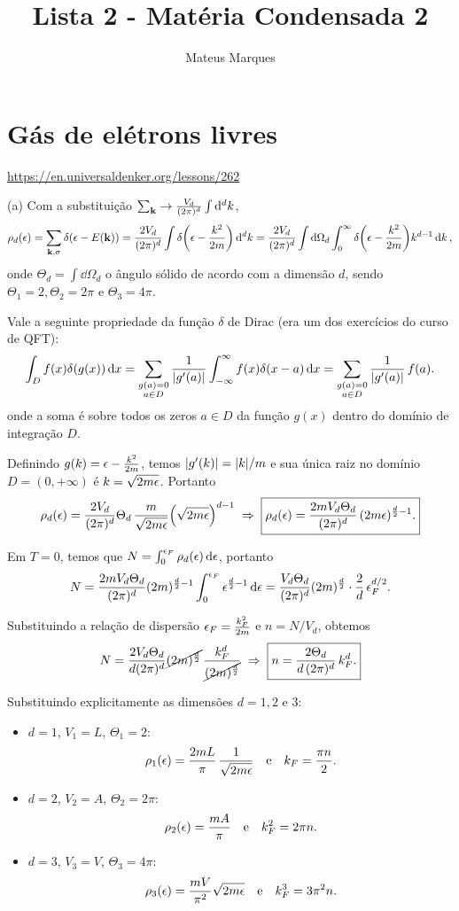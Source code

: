 \documentclass[a4paper,10pt]{article}
\title{\Huge{\textbf{Lista 2 - Matéria Condensada 2}}}
\author{Mateus Marques}
\begin{document}
\maketitle


\section{Gás de elétrons livres}

\url{https://en.universaldenker.org/lessons/262}

(a) Com a substituição $\sum_{\k} \to \frac{V_d}{(2\pi)^d} \int \dd[d]{k}$,
$$
\rho_d(\eps) = \sum_{\k, \s} \delta(\eps - E(\k)) =
\frac{2V_d}{(2\pi)^d} \int \delta\qty(\eps - \frac{k^2}{2m}) \dd[d]{k} =
\frac{2V_d}{(2\pi)^d} \int \dd{\Omega_d} \int_0^\infty \delta\qty(\eps - \frac{k^2}{2m}) k^{d-1} \dd{k},
$$
onde $\Theta_d = \int \dd{\Omega_d}$ o ângulo sólido de acordo com a dimensão $d$, sendo $\Theta_1 = 2, \Theta_2 = 2\pi$ e $\Theta_3 = 4\pi$.

Vale a seguinte propriedade da função $\delta$ de Dirac (era um dos exercícios do curso de QFT):
$$
\int_{D} f(x) \delta(g(x)) \dd{x} =
\sum_{\substack{g(a)=0 \\ a \in D}} \frac{1}{\abs{g'(a)}} \int_{-\infty}^{\infty} f(x) \delta(x-a) \dd{x}=
\sum_{\substack{g(a)=0 \\ a \in D}} \frac{1}{\abs{g'(a)}} \, f(a).
$$
onde a soma é sobre todos os zeros $a \in D$ da função $g(x)$ dentro do domínio de integração $D$.

Definindo $g(k) = \eps - \frac{k^2}{2m}$, temos $\abs{g'(k)} = \abs{k} / m$ e sua única raiz no domínio $D = (0, +\infty)$ é $k = \sqrt{2m \eps}$. Portanto
$$
\rho_d(\eps) = \frac{2V_d}{(2\pi)^d} \Theta_d \, \frac{m}{\sqrt{2m\eps}}
\qty(\sqrt{2m \eps})^{d-1} \implies
\boxed{ \rho_d(\eps) = \frac{2 m V_d \Theta_d}{(2\pi)^d} \, (2m\eps)^{\frac{d}{2}-1}. }
$$

Em $T = 0$, temos que $N = \int_0^{\eps_F} \rho_d(\eps) \dd{\eps}$, portanto
$$
N = \frac{2m V_d \Theta_d}{(2\pi)^d} (2m)^{\frac{d}{2} - 1} \int_0^{\eps_F} \eps^{\frac{d}{2} - 1} \dd{\eps} =
\frac{V_d \Theta_d }{(2\pi)^d} (2m)^{\frac{d}{2}} \cdot \frac{2}{d} \, \eps_F^{d/2}.
$$

Substituindo a relação de dispersão $\eps_F = \frac{k_F^2}{2m}$ e $n = N/V_d$, obtemos
$$
N =
\frac{2 V_d \Theta_d }{d (2\pi)^d} \cancel{(2m)^{\frac{d}{2}}} \, \frac{k_F^d}{\cancel{(2m)^{\frac{d}{2}}}} \implies
\boxed{ n = \frac{2 \Theta_d}{d \, (2\pi)^d} \, k_F^d. }
$$

Substituindo explicitamente as dimensões $d = 1, 2$ e $3$:
\begin{itemize}
\item $d = 1$, $V_1 = L$, $\Theta_1 = 2$:
$$
\rho_1(\eps) = \frac{2 m L}{\pi} \, \frac{1}{\sqrt{2m\eps}} \e
k_F = \frac{\pi n}{2}.
$$
\item $d = 2$, $V_2 = A$, $\Theta_2 = 2\pi$:
$$
\rho_2(\eps) = \frac{m A}{\pi} \e
k_F^2 = 2 \pi n.
$$
\item $d = 3$, $V_3 = V$, $\Theta_3 = 4\pi$:
$$
\rho_3(\eps) = \frac{m V}{\pi^2} \sqrt{2m\eps} \e
k_F^3 = 3\pi^2 n.
$$
\end{itemize}
\end{document}
